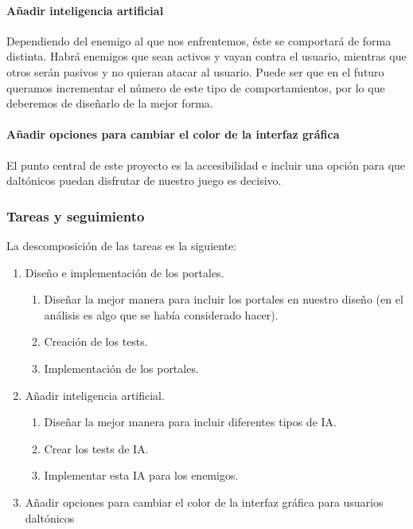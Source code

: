 \paragraph{Añadir inteligencia artificial} Dependiendo del enemigo al que nos enfrentemos, éste se comportará de forma distinta. Habrá enemigos que sean activos y vayan contra el usuario, mientras que otros serán pasivos y no quieran atacar al usuario. Puede ser que en el futuro queramos incrementar el número de este tipo de comportamientos, por lo que deberemos de diseñarlo de la mejor forma.

\paragraph{Añadir opciones para cambiar el color de la interfaz gráfica} El punto central de este proyecto es la accesibilidad e incluir una opción para que daltónicos puedan disfrutar de nuestro juego es decisivo.

\subsubsection{Tareas y seguimiento}

La descomposición de las tareas es la siguiente:

\begin{enumerate}[label=\bfseries WBS 2.\arabic*]
  \item Diseño e implementación de los portales.
    \begin{enumerate}[label=\bfseries WBS 2.1.\arabic*]
      \item Diseñar la mejor manera para incluir los portales en nuestro diseño (en el análisis es algo que se había considerado hacer).
      \item Creación de los tests.
      \item Implementación de los portales.
    \end{enumerate}
  \item Añadir inteligencia artificial.
  	\begin{enumerate}[label=\bfseries WBS 2.2.\arabic*]
      \item Diseñar la mejor manera para incluir diferentes tipos de IA.
      \item Crear los tests de IA.
      \item Implementar esta IA para los enemigos.
    \end{enumerate}
  \item Añadir opciones para cambiar el color de la interfaz gráfica para usuarios daltónicos
\end{enumerate}

